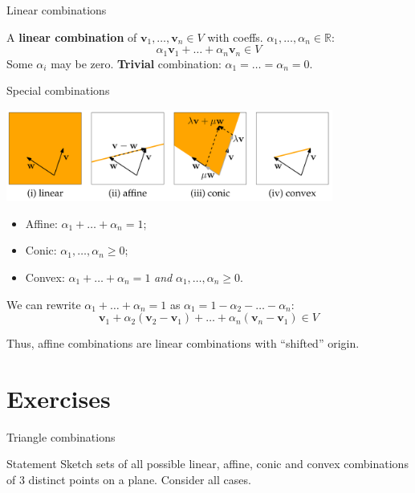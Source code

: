 \documentclass[10pt]{beamer}
\begin{document}
\begin{frame}{Linear combinations}

    A \textbf{linear combination} of $\mathbf v_1, \dots, \mathbf v_n \in V$ with coeffs. $\alpha_1,\dots,\alpha_n \in \mathbb R$:
    $$
    \alpha_1 \mathbf{v}_1 + \dots+\alpha_n \mathbf{v}_n \in V
    $$
    Some $\alpha_i$ may be zero. \textbf{Trivial} combination: $\alpha_1=\dots=\alpha_n = 0$.

\end{frame}

\begin{frame}{Special combinations}
    \begin{center}
        \includegraphics[height=3cm]{../img/png/combinations}
    \end{center}

    \begin{itemize}
        \item Affine: $\alpha_1 + \dots + \alpha_n = 1$;
        \item Conic: $\alpha_1, \dots, \alpha_n \geq 0$;
        \item Convex: $\alpha_1 + \dots + \alpha_n = 1$ \textit{and} $\alpha_1, \dots, \alpha_n \geq 0$.
    \end{itemize}
    
    We can rewrite $\alpha_1+\dots+\alpha_n=1$ as $\alpha_1 = 1-\alpha_2-\dots-\alpha_n$:
    $$
    \mathbf v_1 + \alpha_2 (\mathbf v_2 - \mathbf v_1) + \dots + \alpha_n(\mathbf v_n - \mathbf v_1) \in V
    $$

    Thus, affine combinations are linear combinations with ``shifted'' origin.
\end{frame}

\section{Exercises}
\begin{frame}{Triangle combinations}
    \begin{block}{Statement}
        Sketch sets of all possible linear, affine, conic and convex combinations of $3$ distinct points on a plane. Consider all cases.
    \end{block}
\end{frame}
\end{document}
